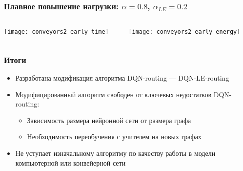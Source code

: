 \documentclass{beamer}
\begin{document}

\begin{frame}
  \frametitle{Плавное повышение нагрузки: $\alpha = 0.8$, $\alpha_{LE} = 0.2$}
  \begin{columns}
    \begin{column}{0.5\textwidth}
      \texttt{[image: conveyors2-early-time]}
    \end{column}

    \begin{column}{0.5\textwidth}
      \texttt{[image: conveyors2-early-energy]}
    \end{column}
  \end{columns}
\end{frame}


\begin{frame}
  \frametitle{Итоги}
  \begin{itemize}
  \item Разработана модификация алгоритма DQN-routing --- DQN-LE-routing
  \item Модифицированный алгоритм свободен от ключевых недостатков DQN-routing:
    \begin{itemize}
    \item Зависимость размера нейронной сети от размера графа
    \item Необходимость переобучения с учителем на новых графах
    \end{itemize}
  \item Не уступает изначальному алгоритму по качеству работы в модели компьютерной или конвейерной сети
  \end{itemize}
\end{frame}



\end{document}
